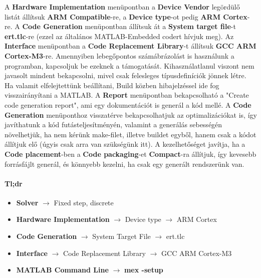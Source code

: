 A \textbf{Hardware Implementation} menüpontban a \textbf{Device Vendor} legördülő listát állítsuk \textbf{ARM Compatible}-re, a \textbf{Device type}-ot pedig \textbf{ARM Cortex}-re.
A \textbf{Code Generation} menüpontban állítsuk át a \textbf{System target file}-t \textbf{ert.tlc}-re (ezzel az általános MATLAB-Embedded codert hívjuk meg).
Az \textbf{Interface} menüpontban a \textbf{Code Replacement Library}-t állítsuk \textbf{GCC ARM Cortex-M3}-re.
Amennyiben lebegőpontos számábrázolást is használunk a programban, kapcsoljuk be ezeknek a támogatását. Kihasználatlanul viszont nem javasolt mindent bekapcsolni, mivel csak felesleges típusdefiníciók jönnek létre. Ha valamit elfelejtettünk beállítani, Build közben hibajelzéssel ide fog visszairányítani a MATLAB.
A \textbf{Report} menüpontban bekapcsolható a "Create code generation report", ami egy dokumentációt is generál a kód mellé.
A \textbf{Code Generation} menüponthoz visszatérve bekapcsolhatjuk az optimalizációkat is, így javíthatunk a kód futásteljesítményén, valamint a generálás sebességén növelhetjük, ha nem kérünk make-filet, illetve buildet egyből, hanem csak a kódot állítjuk elő (úgyis csak arra van szükségünk itt).
A kezelhetőséget javítja, ha a \textbf{Code placement}-ben a \textbf{Code packaging}-et \textbf{Compact}-ra állítjuk, így kevesebb forrásfájlt generál, és könnyebb kezelni, ha csak egy generált rendszerünk van.

\paragraph{Tl;dr}

\begin{itemize}

    \item \textbf{Solver} $\rightarrow$ Fixed step, discrete
    \item \textbf{Hardware Implementation} $\rightarrow$ Device type $\rightarrow$ ARM Cortex
    \item \textbf{Code Generation} $\rightarrow$ System Target File $\rightarrow$ ert.tlc
    \item \textbf{Interface} $\rightarrow$ Code Replacement Library $\rightarrow$ GCC ARM Cortex-M3
    \item \textbf{MATLAB Command Line} $\rightarrow$ \textbf{mex -setup}

\end{itemize}

